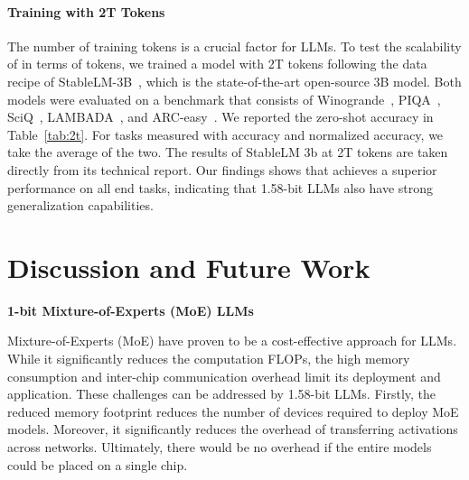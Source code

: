 \paragraph{Training with 2T Tokens}

The number of training tokens is a crucial factor for LLMs. To test the scalability of  in terms of tokens, we trained a  model with 2T tokens following the data recipe of StableLM-3B~\cite{StableLM-3B-4E1T}, which is the state-of-the-art open-source 3B model. Both models were evaluated on a benchmark that consists of Winogrande~\cite{winoGrande}, PIQA~\cite{piqa}, SciQ~\cite{sciq}, LAMBADA~\cite{lambada}, and ARC-easy~\cite{arc}. We reported the zero-shot accuracy in Table~\ref{tab:2t}. For tasks measured with accuracy and normalized accuracy, we take the average of the two. The results of StableLM 3b at 2T tokens are taken directly from its technical report. Our findings shows that  achieves a superior performance on all end tasks, indicating that 1.58-bit LLMs also have strong generalization capabilities.

\begin{table}[t]
\caption{Comparison of  with StableLM-3B with 2T tokens.}

\label{tab:2t}
\end{table}

\section{Discussion and Future Work}

\textbf{1-bit Mixture-of-Experts (MoE) LLMs}

Mixture-of-Experts (MoE) have proven to be a cost-effective approach for LLMs. While it significantly reduces the computation FLOPs, the high memory consumption and inter-chip communication overhead limit its deployment and application. These challenges can be addressed by 1.58-bit LLMs. Firstly, the reduced memory footprint reduces the number of devices required to deploy MoE models. Moreover, it significantly reduces the overhead of transferring activations across networks. Ultimately, there would be no overhead if the entire models could be placed on a single chip.

